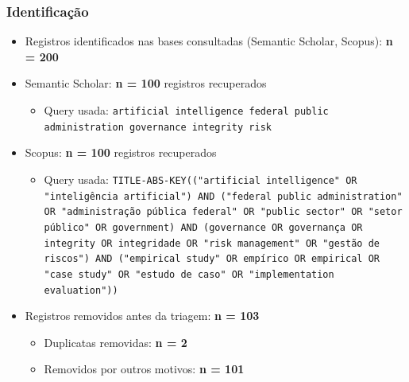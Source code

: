 \documentclass[12pt,a4paper]{article}
\begin{document}
\subsubsection{Identificação}
\label{sec:orgce84d8d}
\begin{itemize}
\item Registros identificados nas bases consultadas (Semantic Scholar, Scopus): \textbf{n = 200}
\item Semantic Scholar: \textbf{n = 100} registros recuperados
\begin{itemize}
\item Query usada: \texttt{artificial intelligence federal public administration governance integrity risk}
\end{itemize}
\item Scopus: \textbf{n = 100} registros recuperados
\begin{itemize}
\item Query usada: \texttt{TITLE-ABS-KEY(("artificial intelligence" OR "inteligência artificial") AND ("federal public administration" OR "administração pública federal" OR "public sector" OR "setor público" OR government) AND (governance OR governança OR integrity OR integridade OR "risk management" OR "gestão de riscos") AND ("empirical study" OR empírico OR empirical OR "case study" OR "estudo de caso" OR "implementation evaluation"))}
\end{itemize}
\item Registros removidos antes da triagem: \textbf{n = 103}
\begin{itemize}
\item Duplicatas removidas: \textbf{n = 2}
\item Removidos por outros motivos: \textbf{n = 101}
\end{itemize}
\end{itemize}
\end{document}
